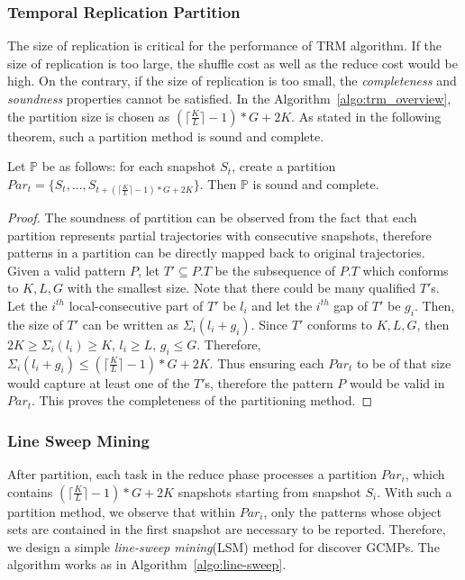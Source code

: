 \subsubsection{Temporal Replication Partition}
The size of replication is critical for the performance of TRM algorithm.
If the size of replication is too large, the shuffle cost as well as the reduce cost would be high. 
On the contrary, if the size of replication is too small, the \emph{completeness} and \emph{soundness}
properties cannot be satisfied. In the Algorithm~\ref{algo:trm_overview}, 
the partition size is chosen as $(\lceil \frac{K}{L} \rceil -1)*G+2K$. As stated in the following
theorem, such a partition method is sound and complete.
\begin{theorem}
\label{thm:replication_partition}
Let $\mathbb{P}$ be as follows: for each snapshot $S_t$, create a partition $Par_t = \{S_t, ...,S_{t+(\lceil \frac{K}{L} \rceil - 1) *G+2K}\}$. Then $\mathbb{P}$ is sound and complete.
\end{theorem}
\begin{proof}
The soundness of partition can be observed from the fact that each partition represents partial trajectories with consecutive snapshots, therefore patterns in a partition can be directly mapped back to original trajectories.
Given a valid pattern $P$, let $T' \subseteq P.T$ be the subsequence of $P.T$ which conforms to $K,L,G$ with the smallest size. Note that there could be many qualified $T'$s.  
Let the $i^{th}$ local-consecutive part of $T'$ be $l_i$ and let the $i^{th}$ gap of $T'$ be $g_i$. Then, the size of $T'$ can be written as $\Sigma_i (l_i + g_i)$. 
Since $T'$ conforms to $K,L,G$, then $2K \geq \Sigma_i (l_i) \geq K$, $l_i \geq L$, $g_i \leq G$. Therefore, $\Sigma_i(l_i+g_i) \leq (\lceil \frac{K}{L} \rceil -1) *G+2K$. Thus ensuring each $Par_t$ to be of that size would capture at least one of the $T'$s, therefore the pattern $P$ would be valid in $Par_t$. This proves the completeness of the partitioning method.
\end{proof}

\subsubsection{Line Sweep Mining}
After partition, each task in the reduce phase processes a partition $Par_i$, which contains
$(\lceil \frac{K}{L} \rceil -1) *G+2K$ snapshots starting from snapshot $S_i$. With such a 
partition method, we observe that within $Par_i$, only the 
patterns whose object sets are contained in the first snapshot are necessary to be reported.
Therefore, we design a simple \emph{line-sweep mining}(LSM) method for discover
GCMPs. The algorithm works as in Algorithm~\ref{algo:line-sweep}.

